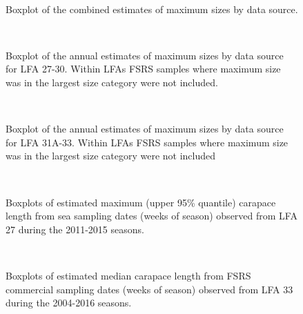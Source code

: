 \documentclass[11pt]{article}
\newcommand{\e}{/backup/bio_data/bio.lobster/figures/} %
\begin{document}

\begin{figure}
        \centering
         \\
                     \caption{Boxplot of the combined estimates of maximum sizes by data source.}
        \end{figure}


\begin{figure}
       \centering
        \\
                    \caption{Boxplot of the annual estimates of maximum sizes by data source for LFA 27-30. Within LFAs FSRS samples where maximum size was in the largest size category were not included.}
       \end{figure}

\begin{figure}
       \centering
        \\
                    \caption{Boxplot of the annual estimates of maximum sizes by data source for LFA 31A-33. Within LFAs FSRS samples where maximum size was in the largest size category were not included}
       \end{figure}


\begin{figure}
        \centering
         \\
                     \caption{Boxplots of estimated maximum (upper 95\% quantile) carapace length from sea sampling dates (weeks of season) observed from LFA 27 during the 2011-2015 seasons. }
        \end{figure}

\begin{figure}
        \centering
         \\
                     \caption{Boxplots of estimated median carapace length from FSRS commercial sampling dates (weeks of season) observed from LFA 33 during the 2004-2016 seasons. }
        \end{figure}
\end{document}

